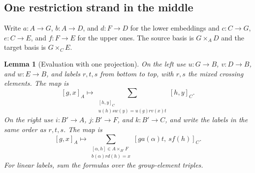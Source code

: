 \documentclass[11pt,a4paper]{article}
\numberwithin{equation}{section}
\newtheorem{lemma}[theorem]{Lemma}
\theoremstyle{definition}
\newcommand{\mixedThreeWires}[3]{%
  \draw[#1] (0,0)--(0,.26)
    .. controls (0,.73) and (1.4,.91) .. (1.4,1.45)
    --(1.4,1.79)
    .. controls (1.4,2.33) and (2.8,2.47) .. (2.8,3.01)
    --(2.8,4.8);
  \draw[#2] (1.4,0)--(1.4,.26)
    .. controls (1.4,.73) and (0,.91) .. (0,1.45)
    --(0,3.35)
    .. controls (0,3.89) and (1.4,4.03) .. (1.4,4.57)
    --(1.4,4.8);
  \draw[#3] (2.8,0)--(2.8,1.79)
    .. controls (2.8,2.33) and (1.4,2.47) .. (1.4,3.01)
    --(1.4,3.35)
    .. controls (1.4,3.89) and (0,4.03) .. (0,4.57)
    --(0,4.8);
}
\newcommand{\mixedThreeLeft}{%
  \foreach \x/\y/\i/\offset in {.7/.82875/1/-.43,2.1/2.4/2/.43,.7/3.96/3/-.43}{
    \fill (\x,\y) circle (1.9pt);
    \node[strandlabel] at ({\x+\offset},\y) {$x_{\i}$};
  }
  \node[region] at (.69,2.4) {$B$};
}
\newcommand{\mixedThreeRight}{%
  \foreach \x/\y/\i/\offset in {2.1/.82875/1/.43,.7/2.4/2/-.43,2.1/3.96/3/.43}{
    \fill (\x,\y) circle (1.9pt);
    \node[strandlabel] at ({\x+\offset},\y) {$y_{\i}$};
  }
  \node[region] at (2.11,2.4) {$B'$};
}
\newcommand{\mixedThreeBoundary}[7]{%
  \node[region] at (-.48,2.4) {$G$};
  \node[region] at (3.28,2.4) {$F$};
  \node[region] at (.70,.18) {$#1$};
  \node[region] at (2.10,.18) {$#2$};
  \node[region] at (.70,4.60) {$#3$};
  \node[region] at (2.10,4.60) {$#4$};
  \foreach \x/\lab in {#5} {\node[strandlabel] at (\x,-.35) {$\bar\lab$};}
  \foreach \x/\lab in {#6} {\node[strandlabel] at (\x,5.15) {$\bar\lab$};}
  \node[font=\normalsize] at (1.4,-.90) {Case #7};
}
\begin{document}
\subsection{One restriction strand in the middle}

\begin{center}
\end{center}

Write \(a:A\to G\), \(b:A\to D\), and \(d:F\to D\) for the lower
embeddings and \(c:C\to G\), \(e:C\to E\), and \(f:F\to E\) for the upper ones.
The source basis is \(G\times_A D\) and the target basis is \(G\times_C E\).

\begin{lemma}[Evaluation with one projection]\label{lem:three-middle-restriction}
On the left use \(u:G\to B\), \(v:D\to B\), and \(w:E\to B\),
and labels \(r,t,s\) from bottom to top, with \(r,s\) the mixed crossing elements.
The map is
\begin{equation}\label{eq:three-left-middle-restriction}
 [g,x]_A\longmapsto
 \sum_{\substack{[h,y]_C\\u(h)s w(y)=u(g)r v(x)t}}[h,y]_C .
\end{equation}
On the right use \(i:B'\to A\), \(j:B'\to F\), and \(k:B'\to C\),
and write the labels in the same order as \(r,t,s\). The map is
\begin{equation}\label{eq:three-right-middle-restriction}
 [g,x]_A\longmapsto
 \sum_{\substack{[\alpha,h]\in A\times_{B'}F\\ b(\alpha)r d(h)=x}}
       [ga(\alpha)t,\ s f(h)]_C .
\end{equation}
For linear labels, sum the formulas over the group-element triples.
\end{lemma}
\end{document}
